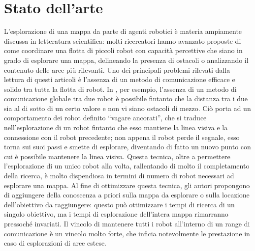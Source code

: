 \chapter{Stato dell'arte}
\label{chap:stateofart}
L'esplorazione di una mappa da parte di agenti robotici è materia ampiamente discussa in letteratura scientifica: molti ricercatori hanno avanzato proposte di come coordinare una flotta di piccoli robot con capacità percettive che siano in grado di esplorare una mappa, delineando la presenza di ostacoli o analizzando il contenuto delle aree più rilevanti. Uno dei principali problemi rilevati dalla lettura di questi articoli è l'assenza di un metodo di comunicazione efficace e solido tra tutta la flotta di robot. In \cite{arkin2002line}, per esempio, l'assenza di un metodo di comunicazione globale tra due robot è possibile fintanto che la distanza tra i due sia al di sotto di un certo valore e non vi siano ostacoli di mezzo. Ciò porta ad un comportamento dei robot definito “vagare ancorati”, che si traduce nell'esplorazione di un robot fintanto che esso mantiene la linea visiva e la connessione con il robot precedente; non appena il robot perde il segnale, esso torna sui suoi passi e smette di esplorare, diventando di fatto un nuovo punto con cui è possibile mantenere la linea visiva. Questa tecnica, oltre a permettere l'esplorazione di un unico robot alla volta, rallentando di molto il completamento della ricerca, è molto dispendiosa in termini di numero di robot necessari ad esplorare una mappa. Al fine di ottimizzare questa tecnica, gli autori propongono di aggiungere della conoscenza a priori sulla mappa da esplorare o sulla locazione dell'obiettivo da raggiungere: questo può ottimizzare i tempi di ricerca di un singolo obiettivo, ma i tempi di esplorazione dell'intera mappa rimarranno pressoché invariati. Il vincolo di mantenere tutti i robot all'interno di un range di comunicazione è un vincolo molto forte, che inficia notevolmente le prestazione in caso di esplorazioni di aree estese.\\
